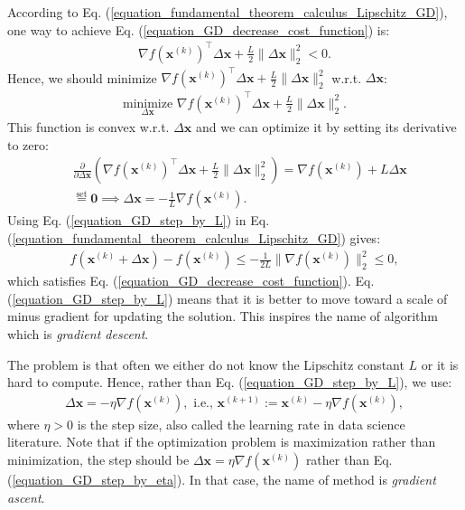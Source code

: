 \documentclass[lang=cn,10pt]{gorgeousnbook}
\numberwithin{equation}{section}%
\numberwithin{figure}{section}%
\begin{document}
According to Eq. (\ref{equation_fundamental_theorem_calculus_Lipschitz_GD}), one way to achieve Eq. (\ref{equation_GD_decrease_cost_function}) is:
\begin{align*}
\nabla f(\boldsymbol{x}^{(k)})^\top \Delta \boldsymbol{x} + \frac{L}{2} \|\Delta \boldsymbol{x}\|_2^2 < 0.
\end{align*}
Hence, we should minimize $\nabla f(\boldsymbol{x}^{(k)})^\top \Delta \boldsymbol{x} + \frac{L}{2} \|\Delta \boldsymbol{x}\|_2^2$ w.r.t. $\Delta \boldsymbol{x}$:
\begin{align}\label{equation_GD_min_RHS_of_corollary_fundamental}
\underset{\Delta\boldsymbol{x}}{\text{minimize}}\,\, \nabla f(\boldsymbol{x}^{(k)})^\top \Delta \boldsymbol{x} + \frac{L}{2} \|\Delta \boldsymbol{x}\|_2^2.
\end{align}
This function is convex w.r.t. $\Delta \boldsymbol{x}$ and we can optimize it by setting its derivative to zero:
\begin{align}
&\frac{\partial }{\partial \Delta \boldsymbol{x}} (\nabla f(\boldsymbol{x}^{(k)})^\top \Delta \boldsymbol{x} + \frac{L}{2} \|\Delta \boldsymbol{x}\|_2^2) = \nabla f(\boldsymbol{x}^{(k)}) + L \Delta \boldsymbol{x} \nonumber\\
&\overset{\text{set}}{=} \boldsymbol{0} \implies \Delta \boldsymbol{x} = -\frac{1}{L} \nabla f(\boldsymbol{x}^{(k)}). \label{equation_GD_step_by_L}
\end{align}
Using Eq. (\ref{equation_GD_step_by_L}) in Eq. (\ref{equation_fundamental_theorem_calculus_Lipschitz_GD}) gives:
\begin{align*}
f(\boldsymbol{x}^{(k)} + \Delta \boldsymbol{x}) - f(\boldsymbol{x}^{(k)}) \leq -\frac{1}{2L} \|\nabla f(\boldsymbol{x}^{(k)})\|_2^2 \leq 0,
\end{align*}
which satisfies Eq. (\ref{equation_GD_decrease_cost_function}).
Eq. (\ref{equation_GD_step_by_L}) means that it is better to move toward a scale of minus gradient for updating the solution. This inspires the name of algorithm which is \textit{gradient descent}. 

The problem is that often we either do not know the Lipschitz constant $L$ or it is hard to compute. Hence, rather than Eq. (\ref{equation_GD_step_by_L}), we use:
\begin{align}\label{equation_GD_step_by_eta}
\Delta \boldsymbol{x} = -\eta \nabla f(\boldsymbol{x}^{(k)}), \text{ i.e., } \boldsymbol{x}^{(k+1)} := \boldsymbol{x}^{(k)} - \eta \nabla f(\boldsymbol{x}^{(k)}),
\end{align}
where $\eta > 0$ is the step size, also called the learning rate in data science literature. 
Note that if the optimization problem is maximization rather than minimization, the step should be $\Delta \boldsymbol{x} = \eta \nabla f(\boldsymbol{x}^{(k)})$ rather than Eq. (\ref{equation_GD_step_by_eta}). In that case, the name of method is \textit{gradient ascent}. 
\end{document}
